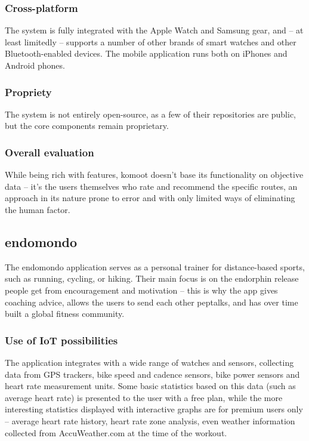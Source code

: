 \subsubsection*{Cross-platform}
The system is fully integrated with the Apple Watch and Samsung gear, and -- at least limitedly -- supports a number of other brands of smart watches and other Bluetooth-enabled devices.
The mobile application runs both on iPhones and Android phones.
\subsubsection*{Propriety}
The system is not entirely open-source, as a few of their repositories are public, but the core components remain proprietary. 

\subsubsection*{Overall evaluation}
While being rich with features, komoot doesn't base its functionality on objective data -- it's the users themselves who rate and recommend the specific routes,
an approach in its nature prone to error and with only limited ways of eliminating the human factor.

\subsection{endomondo}

The endomondo application serves as a personal trainer for distance-based sports, such as running, cycling, or hiking.
Their main focus is on the endorphin release people get from encouragement and motivation -- this is why the app gives coaching advice, allows the users to send each other peptalks, and has over time built a global fitness community.
\subsubsection*{Use of IoT possibilities}
The application integrates with a wide range of watches and sensors, collecting data from GPS trackers, bike speed and cadence sensors, bike power sensors and heart rate measurement units.
Some basic statistics based on this data (such as average heart rate) is presented to the user with a free plan, 
while the more interesting statistics displayed with interactive graphs are for premium users only -- average heart rate history, heart rate zone analysis, even weather information collected from AccuWeather.com at the time of the workout.

